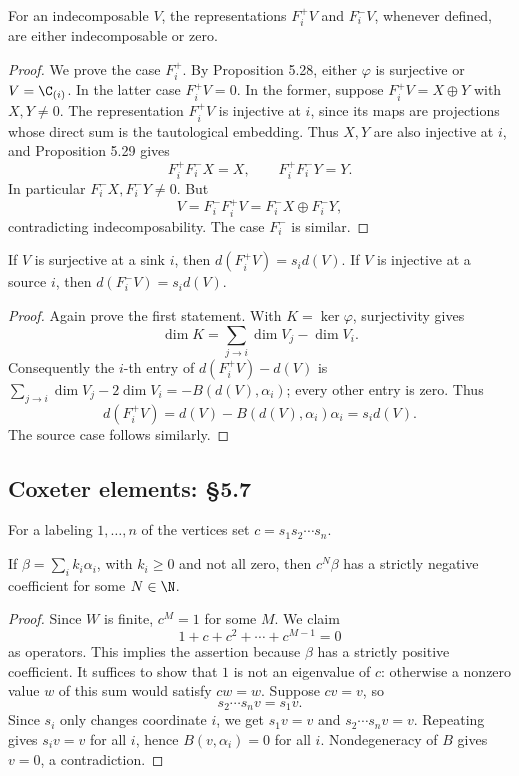 \begin{proposition}[Proposition 5.30]
For an indecomposable $V$, the representations $F_i^+V$ and $F_i^-V$, whenever defined, are either indecomposable or zero.
\end{proposition}
\begin{proof}
We prove the case $F_i^+$. By Proposition 5.28, either $\varphi$ is surjective or $V=\C_{(i)}$. In the latter case $F_i^+V=0$. In the former, suppose $F_i^+V=X\oplus Y$ with $X,Y\ne0$. The representation $F_i^+V$ is injective at $i$, since its maps are projections whose direct sum is the tautological embedding. Thus $X,Y$ are also injective at $i$, and Proposition 5.29 gives
\[
F_i^+F_i^-X=X,\qquad F_i^+F_i^-Y=Y.
\]
In particular $F_i^-X,F_i^-Y\ne0$. But
\[
V=F_i^-F_i^+V=F_i^-X\oplus F_i^-Y,
\]
contradicting indecomposability. The case $F_i^-$ is similar.
\end{proof}

\begin{proposition}[Proposition 5.31]
If $V$ is surjective at a sink $i$, then $d(F_i^+V)=s_i d(V)$. If $V$ is injective at a source $i$, then $d(F_i^-V)=s_i d(V)$.
\end{proposition}
\begin{proof}
Again prove the first statement. With $K=\ker\varphi$, surjectivity gives
\[
\dim K=\sum_{j\to i}\dim V_j-\dim V_i.
\]
Consequently the $i$-th entry of $d(F_i^+V)-d(V)$ is $\sum_{j\to i}\dim V_j-2\dim V_i=-B(d(V),\alpha_i)$; every other entry is zero. Thus
\[
d(F_i^+V)=d(V)-B(d(V),\alpha_i)\alpha_i=s_i d(V).
\]
The source case follows similarly.
\end{proof}

\subsection*{Coxeter elements: §5.7}
For a labeling $1,\ldots,n$ of the vertices set $c=s_1s_2\cdots s_n$.
\begin{lemma}[Lemma 5.33]
If $\beta=\sum_i k_i\alpha_i$, with $k_i\ge0$ and not all zero, then $c^N\beta$ has a strictly negative coefficient for some $N\in\N$.
\end{lemma}
\begin{proof}
Since $W$ is finite, $c^M=1$ for some $M$. We claim
\[
1+c+c^2+\cdots+c^{M-1}=0
\]
as operators. This implies the assertion because $\beta$ has a strictly positive coefficient.
It suffices to show that $1$ is not an eigenvalue of $c$: otherwise a nonzero value $w$ of this sum would satisfy $cw=w$. Suppose $cv=v$, so
\[
s_2\cdots s_nv=s_1v.
\]
Since $s_i$ only changes coordinate $i$, we get $s_1v=v$ and $s_2\cdots s_nv=v$. Repeating gives $s_iv=v$ for all $i$, hence $B(v,\alpha_i)=0$ for all $i$. Nondegeneracy of $B$ gives $v=0$, a contradiction.
\end{proof}

